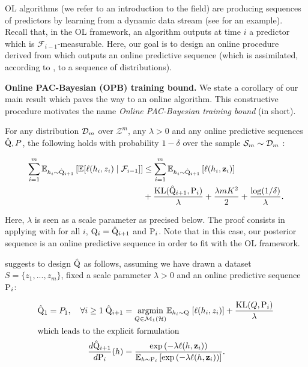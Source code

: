 OL algorithms (we refer to \citealp{hazan2016introduction}  an introduction to the field) are producing sequences of predictors by learning from a dynamic data stream (see  for an example). Recall that, in the OL framework, an algorithm outputs at time $i$ a predictor which is $\mathcal{F}_{i-1}$-measurable. Here, our goal is to design an online procedure derived from  which outputs an online predictive sequence (which is assimilated, according to , to a sequence of distributions).


\textbf{Online PAC-Bayesian (OPB) training bound.} We state a corollary of our main result which paves the way to an online algorithm. This constructive procedure motivates the name \emph{ Online PAC-Bayesian training bound} (\OPBTrain in short).

\begin{corollary}
  \label{cor: online_procedure}
  For any distribution $\Dm$ over $\mathcal{Z}^m$, any $\lambda>0$ and any online predictive sequences $\hat{\Q},P$, the following holds with probability $1-\delta$ over the sample $\Sm\sim\Dm$ :

  \begin{align*}
    \sum_{i=1}^m \mathbb{E}_{h_i\sim \hat{\Q}_{i+1}}\left[ \mathbb{E}[\ell(h_i,z_i) \mid \mathcal{F}_{i-1}]    \right] & \leq \sum_{i=1}^m \mathbb{E}_{h_i\sim \hat{\Q}_{i+1}}\left[ \ell(h_i,\z_i) \right] \\
    & + \frac{\operatorname{KL}(\hat{\Q}_{i+1}, \P_{i})}{\lambda} + \frac{\lambda m K^2}{2} + \frac{\log(1/\delta)}{\lambda}.
  \end{align*}
\end{corollary}
Here, $\lambda$ is seen as a scale parameter as precised below.
The proof consists in applying  with for all $i$, $\Q_{i}= \hat{\Q}_{i+1}$ and $\P_{i}$.
Note that in this case, our posterior sequence is an online predictive sequence in order to fit with the OL framework.


 suggests to design $\hat{\Q}$ as follows, assuming we have drawn a dataset $S= \{z_1,...,z_m\}$, fixed a scale parameter $\lambda>0$  and an online predictive sequence $\P_{i}$:

\begin{align}
  \label{eq: pacb_online_alg}
  \hat{\Q}_1= P_1, \quad \forall i\geq1\; \hat{\Q}_{i+1}&= \underset{Q\in\mathcal{M}_1(\mathcal{H})}{\mathrm{argmin}} \mathbb{E}_{h_i\sim \Q} \; [\ell(h_i,z_i)] + \frac{\operatorname{KL}(Q, \P_{i})}{\lambda} \\
  \intertext{which leads to the explicit formulation}
  \label{eq: catoni_formulation}
  \frac{d\hat{\Q}_{i+1}}{d\P_{i}}(h)& = \frac{\exp\left(-\lambda  \ell(h,\z_i)\right)}{\mathbb{E}_{h\sim \P_{i}}\left[\exp\left(-\lambda  \ell(h,\z_i)\right)\right]}.
\end{align}

